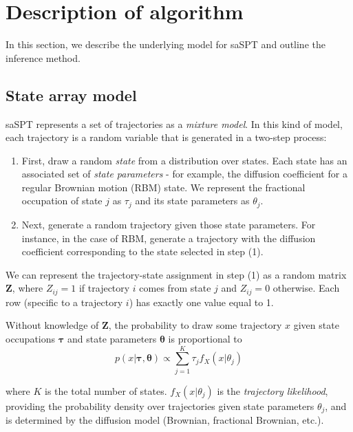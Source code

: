 \documentclass{article}
\renewcommand{\vec}{\mathbf}
\begin{document}
\section{Description of algorithm}

In this section, we describe the underlying model for saSPT and outline the 
inference method.

\subsection{State array model}

saSPT represents a set of trajectories as a \emph{mixture model}. In this kind of model,
each trajectory is a random variable that is generated in a two-step process:
\begin{enumerate}
	\item First, draw a random \emph{state} from a distribution over states. Each state has an associated set of \emph{state parameters} - for example, the diffusion coefficient for a regular Brownian motion (RBM) state. We represent the fractional occupation of state $j$ as $\tau_{j}$ and its state parameters as $\theta_{j}$. 
	\item Next, generate a random trajectory given those state parameters. For instance, in the case of RBM, generate a trajectory with the diffusion coefficient corresponding to the state selected in step (1).
\end{enumerate}

We can represent the trajectory-state assignment in step (1) as a random matrix $\vec{Z}$, 
where $Z_{ij} = 1$ if trajectory $i$ comes from state $j$ and $Z_{ij} = 0$ otherwise. Each
row (specific to a trajectory $i$) has exactly one value equal to 1. \newline

Without knowledge of $\vec{Z}$, the probability to draw some trajectory $x$ given state occupations 
$\boldsymbol{\tau}$ and state parameters $\boldsymbol{\theta}$ is proportional to
\begin{equation}\label{eq:generative_model}
	p \left( x | \boldsymbol{\tau}, \boldsymbol{\theta} \right) \propto \sum\limits_{j=1}^{K} \tau_{j} f_{X}(x | \theta_{j})
\end{equation}

where $K$ is the total number of states. $f_{X}(x | \theta_{j})$ is the 
\emph{trajectory likelihood}, providing the probability density over trajectories
given state parameters $\theta_{j}$, and is determined
by the diffusion model (Brownian, fractional Brownian, etc.). \newline
\end{document}
